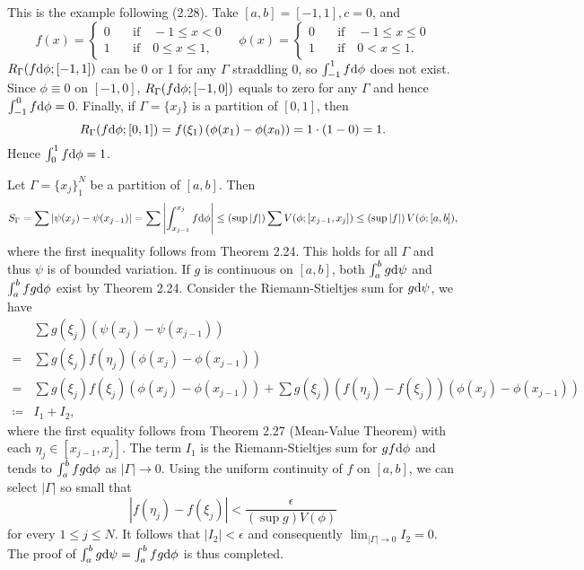 \begin{exercise}{2.14}
  This is the example following (2.28).
  Take $[a,b] = [-1, 1], c=0$, and
  \[
    f(x) = \left\{
    \begin{aligned}
      0 & \quad \text{if} \quad -1 \le x < 0 \\
      1 & \quad \text{if} \quad 0 \le x \le 1,
    \end{aligned}
    \right.
    \quad
    \phi(x) = \left\{
    \begin{aligned}
      0 & \quad \text{if} \quad -1 \le x \le 0 \\
      1 & \quad \text{if} \quad 0 < x \le 1.
    \end{aligned}
    \right.
  \]
  $R_\Gamma(f\mathrm{d} \phi; [-1, 1])$ can be 0 or 1 for any $\Gamma$ straddling $0$,
  so $\int_{-1}^1 f\mathrm{d} \phi$ does not exist.
  Since $\phi \equiv 0$ on $[-1, 0]$,
  $R_\Gamma(f \mathrm{d} \phi; [-1, 0])$ equals to zero for any $\Gamma$
  and hence $\int_{-1}^0 f \mathrm{d} \phi = 0$.
  Finally, if $\Gamma = \{x_j\}$ is a partition of $[0, 1]$, then
  \[
    R_\Gamma(f \mathrm{d} \phi; [0, 1]) = f(\xi_1) \left( \phi(x_1) - \phi(x_0) \right)
    = 1 \cdot (1-0) = 1.
  \]
  Hence $\int_0^1 f \mathrm{d} \phi = 1$.
\end{exercise}

\begin{exercise}{2.15}
  Let $\Gamma = \{x_j\}_1^N$ be a partition of $[a,b]$. Then
  \[
    S_\Gamma = \sum \left\vert \psi(x_j) - \psi(x_{j-1}) \right\vert
    = \sum \left\vert \int_{x_{j-1}}^{x_j} f \mathrm{d} \phi \right\vert
    \le \left(\sup |f|\right) \sum V(\phi; [x_{j-1}, x_j])
    \le \left(\sup |f|\right) V(\phi; [a,b]),
  \]
  where the first inequality follows from Theorem 2.24.
  This holds for all $\Gamma$ and thus $\psi$ is of bounded variation.
  If $g$ is continuous on $[a,b]$,
  both $\int_a^b g \mathrm{d} \psi$ and $\int_a^b fg \mathrm{d} \phi$ exist
  by Theorem 2.24.
  Consider the Riemann-Stieltjes sum for $g \mathrm{d} \psi$, we have
  \begin{align*}
    & \sum g(\xi_j) \left( \psi(x_j) - \psi(x_{j-1}) \right) \\
    = & \sum g(\xi_j) f(\eta_j) \left( \phi(x_j) - \phi(x_{j-1}) \right) \\
    = & \sum g(\xi_j) f(\xi_j) \left( \phi(x_j) - \phi(x_{j-1}) \right)
    + \sum g(\xi_j) \left( f(\eta_j) - f(\xi_j) \right)
    \left( \phi(x_j) - \phi(x_{j-1}) \right) \\
    \coloneqq & I_1 + I_2,
  \end{align*}
  where the first equality follows from Theorem 2.27 (Mean-Value Theorem)
  with each $\eta_j \in [x_{j-1}, x_j]$.
  The term $I_1$ is the Riemann-Stieltjes sum for $gf \mathrm{d} \phi$
  and tends to $\int_a^b fg \mathrm{d} \phi$ as $|\Gamma| \rightarrow 0$.
  Using the uniform continuity of $f$ on $[a,b]$,
  we can select $|\Gamma|$ so small that
  \[
    \left\vert f(\eta_j) - f(\xi_j) \right\vert <
    \frac{\epsilon} {\left( \sup g \right) V(\phi)}
  \]
  for every $1 \le j \le N$.
  It follows that $|I_2| < \epsilon$
  and consequently $\lim_{|\Gamma| \rightarrow 0} I_2 = 0$.
  The proof of $\int_a^b g \mathrm{d} \psi = \int_a^b fg \mathrm{d} \phi$ is thus completed.

\end{exercise}

